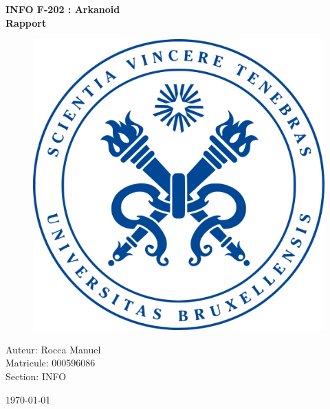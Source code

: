 \documentclass[utf8]{article}
\begin{document}
\begin{titlepage}
    \centering
    
    \vspace*{1cm}
    {\huge \bfseries INFO F-202 : Arkanoid\\
                    Rapport \par}
    
    \vfill
    
    \begin{figure}[h]
        \centering
        \includegraphics[scale=0.2]{images/logo.png}
    \end{figure}
    
    \vfill
    
    {\large Auteur: Rocca Manuel\\ 
            Matricule: 000596086 \\ 
            Section: INFO \par}
    {\large \today \par}
\end{titlepage}

\newpage
\tableofcontents
\end{document}
